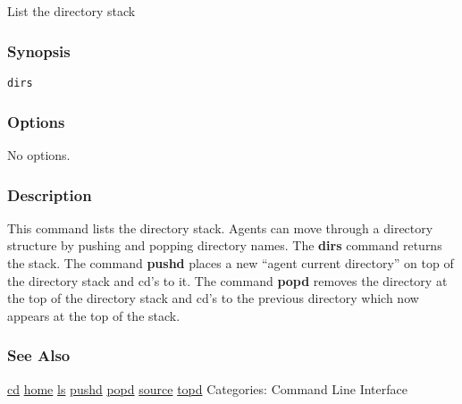 \subsection{}
\label{dirs}
List the directory stack 
\subsubsection*{Synopsis}
\begin{verbatim}
dirs
\end{verbatim}
\subsubsection*{Options}
 No options. 
\subsubsection*{Description}
 This command lists the directory stack. Agents can move through a directory structure by pushing and popping directory names. The \textbf{dirs}
 command returns the stack. 
 The command \textbf{pushd}
 places a new ``agent current directory'' on top of the directory stack and cd's to it. The command \textbf{popd}
 removes the directory at the top of the directory stack and cd's to the previous directory which now appears at the top of the stack. 
\subsubsection*{See Also}
\hyperref[cd]{cd} \hyperref[home]{home} \hyperref[ls]{ls} \hyperref[pushd]{pushd} \hyperref[popd]{popd} \hyperref[source]{source} \hyperref[topd]{topd}  Categories: Command Line Interface
